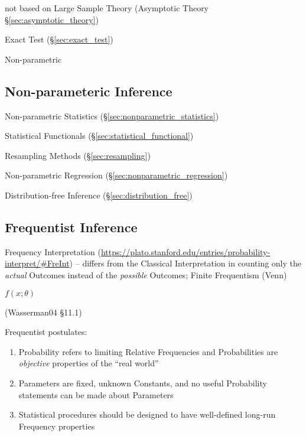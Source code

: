 not based on Large Sample Theory (Asymptotic Theory
\S\ref{sec:asymptotic_theory})

\fist Exact Test (\S\ref{sec:exact_test})

Non-parametric



\subsection{Non-parameteric Inference}\label{sec:nonparametric_inference}

\fist Non-parametric Statistics (\S\ref{sec:nonparametric_statistics})

Statistical Functionals (\S\ref{sec:statistical_functional})

Resampling Methods (\S\ref{sec:resampling})

Non-parametric Regression (\S\ref{sec:nonparametric_regression})

Distribution-free Inference (\S\ref{sec:distribution_free})



\subsection{Frequentist Inference}\label{sec:frequentist_inference}

Frequency Interpretation
(\url{https://plato.stanford.edu/entries/probability-interpret/#FreInt}) --
differs from the Classical Interpretation in counting only the \emph{actual}
Outcomes instead of the \emph{possible} Outcomes; Finite Frequentism (Venn)

$f(x; \theta)$

(Wasserman04 \S11.1)

Frequentist postulates:
\begin{enumerate}
  \item Probability refers to limiting Relative Frequencies and Probabilities
    are \emph{objective} properties of the ``real world''
  \item Parameters are fixed, unknown Constants, and no useful Probability
    statements can be made about Parameters
  \item Statistical procedures should be designed to have well-defined long-run
    Frequency properties
\end{enumerate}

